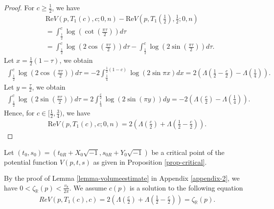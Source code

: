 \documentclass[12pt]{amsart}
\begin{document}
\begin{proof}
For $c\geq \frac{1}{2}$, we have
\begin{align}
    &\text{Re} V(p,T_1(c),c;0,n)-\text{Re} V\left(p,T_1\left(\frac{1}{2}\right),\frac{1}{2};0,n\right)\\\nonumber
    &=\int_{\frac{1}{2}}^{c}\log \left(\cot\left(\frac{\pi \tau}{2}\right)\right)d\tau\\\nonumber
    &=\int_{\frac{1}{2}}^{c}\log \left(2\cos\left(\frac{\pi \tau}{2}\right)\right)d\tau-\int_{\frac{1}{2}}^{c}\log \left(2\sin\left(\frac{\pi \tau}{2}\right)\right)d\tau. 
\end{align}
Let $x=\frac{1}{2}(1-\tau)$, we obtain 
\begin{align}
    \int_{\frac{1}{2}}^{c}\log \left(2\cos\left(\frac{\pi \tau}{2}\right)\right)d\tau =-2\int_{\frac{1}{4}}^{\frac{1}{2}(1-c)}\log(2\sin \pi x)dx=2\left(\Lambda\left(\frac{1}{2}-\frac{c}{2}\right)-\Lambda\left(\frac{1}{4}\right)\right).
\end{align}
Let $y=\frac{\tau}{2}$, we obtain
\begin{align}
    \int_{\frac{1}{2}}^{c}\log \left(2\sin\left(\frac{\pi \tau}{2}\right)\right)d\tau=2\int_{\frac{1}{4}}^{\frac{c}{2}}\log(2\sin (\pi y))dy=-2\left(\Lambda\left(\frac{c}{2}\right)-\Lambda\left(\frac{1}{4}\right)\right).
\end{align}
Hence, for $c\in [\frac{1}{2},\frac{3}{4})$, we have 
\begin{align}
     \text{Re} V(p,T_1(c),c;0,n)=2\left(\Lambda\left(\frac{c}{2}\right)+\Lambda\left(\frac{1}{2}-\frac{c}{2}\right)\right).
\end{align}
\end{proof}
Let $(t_0,s_0)=(t_{0R}+X_0\sqrt{-1},s_{0R}+Y_0\sqrt{-1})$ be a critical point of the potential function $V(p,t,s)$ as given in  Proposition \ref{prop-critical}.  

By the proof of Lemma \ref{lemma-volumeestimate} in Appendix \ref{appendix-2}, we have $0<\zeta_{\mathbb{R}}(p)<\frac{v_8}{2\pi}$.  We assume $c(p)$ is a solution to the following equation
\begin{align}
    Re V(p,T_1(c),c)=2 \left(\Lambda\left(\frac{c}{2}\right)+\Lambda\left(\frac{1}{2}-\frac{c}{2}\right)\right)=\zeta_{\mathbb{R}}(p).
\end{align}
\end{document}
